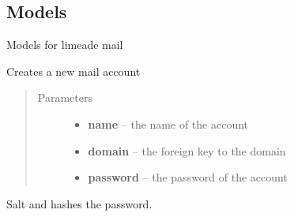 \documentclass[letterpaper,10pt,english]{sphinxmanual}
\begin{document}
\subsection{Models}
\label{api/mail:models}\label{api/mail:module-limeade.mail.models}
Models for limeade mail

\begin{fulllineitems}
\label{api/mail:limeade.mail.models.Account}
Creates a new mail account
\begin{quote}\begin{description}
\item[{Parameters}] \leavevmode\begin{itemize}
\item {} 
\textbf{name} -- the name of the account

\item {} 
\textbf{domain} -- the foreign key to the domain

\item {} 
\textbf{password} -- the password of the account

\end{itemize}

\end{description}\end{quote}

\begin{fulllineitems}
\label{api/mail:limeade.mail.models.Account.set_password}
Salt and hashes the password.

\end{fulllineitems}


\end{fulllineitems}

\end{document}
